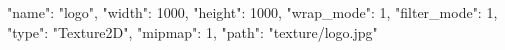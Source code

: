 {
  "name": "logo",
  "width": 1000,
  "height": 1000,
  "wrap_mode": 1,
  "filter_mode": 1,
  "type": "Texture2D",
  "mipmap": 1,
  "path": "texture/logo.jpg"
}